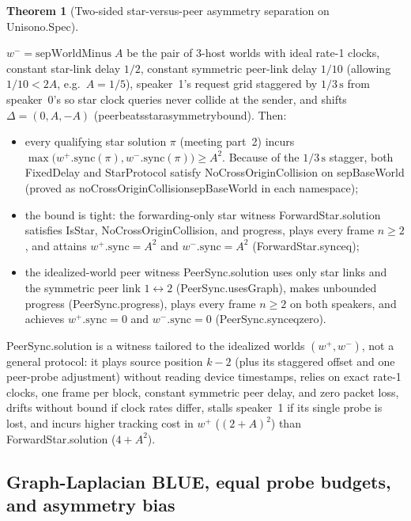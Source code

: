 \documentclass[11pt,a4paper]{article}
\DeclareRobustCommand{\lean}[1]{{\ttfamily\def\_{\textunderscore\allowbreak}#1}}
\theoremstyle{definition}
\newtheorem{theorem}[definition]{Theorem}
\begin{document}
\begin{theorem}[Two-sided star-versus-peer asymmetry separation on \lean{Unisono.Spec}]
\begin{enumerate}
  $w^- = \mathrm{sepWorldMinus}\;A$ be the pair of 3-host worlds with ideal
  rate-1 clocks, constant star-link delay $1/2$, constant symmetric peer-link
  delay $1/10$ (allowing $1/10 < 2A$, e.g.\ $A = 1/5$), speaker~1's request
  grid staggered by $1/3\,\text{s}$ from speaker~0's so star clock queries
  never collide at the sender, and shifts $\Delta = (0, A, -A)$
  (\lean{peer\_beats\_star\_asymmetry\_bound}). Then:
  \begin{itemize}
  \item every qualifying star solution $\pi$ (meeting part~2) incurs
    $\max\bigl(w^+.\mathrm{sync}(\pi), w^-.\mathrm{sync}(\pi)\bigr) \ge A^2$.
    Because of the $1/3\,\text{s}$ stagger, both \lean{FixedDelay} and
    \lean{StarProtocol} satisfy \lean{NoCrossOriginCollision} on
    \lean{sepBaseWorld} (proved as \lean{noCrossOriginCollision\_sepBaseWorld}
    in each namespace);
  \item the bound is tight: the forwarding-only star witness
    \lean{ForwardStar.solution} satisfies \lean{IsStar},
    \lean{NoCrossOriginCollision}, and progress, plays every frame $n \ge 2$,
    and attains $w^+.\mathrm{sync} = A^2$ and $w^-.\mathrm{sync} = A^2$
    (\lean{ForwardStar.sync\_eq});
  \item the idealized-world peer witness \lean{PeerSync.solution} uses only
    star links and the symmetric peer link $1 \leftrightarrow 2$
    (\lean{PeerSync.usesGraph}), makes unbounded progress
    (\lean{PeerSync.progress}), plays every frame $n \ge 2$ on both speakers,
    and achieves $w^+.\mathrm{sync} = 0$ and $w^-.\mathrm{sync} = 0$
    (\lean{PeerSync.sync\_eq\_zero}).
  \end{itemize}
\end{enumerate}
\end{theorem}

\lean{PeerSync.solution} is a witness tailored to the idealized worlds
$(w^+, w^-)$, not a general protocol: it plays source position $k - 2$ (plus
its staggered offset and one peer-probe adjustment) without reading device
timestamps, relies on exact rate-1 clocks, one frame per block, constant
symmetric peer delay, and zero packet loss, drifts without bound if clock rates
differ, stalls speaker~1 if its single probe is lost, and incurs higher
tracking cost in $w^+$ ($(2 + A)^2$) than \lean{ForwardStar.solution}
($4 + A^2$).

\subsection{Graph-Laplacian BLUE, equal probe budgets, and asymmetry bias}
\end{document}
